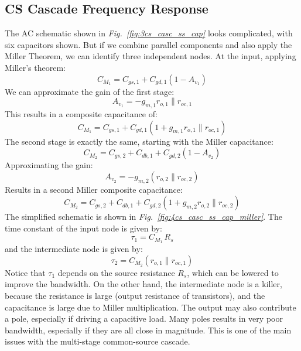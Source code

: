 \subsection{CS Cascade Frequency Response}
The AC schematic shown in \emph{Fig.~\ref{fig:3cs_casc_ss_cap}} looks complicated, with six capacitors shown.  But if we combine parallel components and also apply the Miller Theorem, we can identify three independent nodes.  At the input, applying Miller's theorem:
    \begin{equation} 
        C_{M_1} = C_{gs,1} + C_{gd,1} (1 - A_{v_1})
    \end{equation}
We can approximate the gain of the first stage:
    \begin{equation} 
        A_{v_1} = -g_{m,1} r_{o,1} \parallel r_{oc,1}
    \end{equation}
This results in a composite capacitance of:
    \begin{equation} 
        C_{M_1} = C_{gs,1} + C_{gd,1} (1 + g_{m,1} r_{o,1} \parallel r_{oc,1})
    \end{equation}
The second stage is exactly the same, starting with the Miller capacitance:
    \begin{equation} 
        C_{M_2} = C_{gs,2} + C_{db,1} + C_{gd,2} (1 - A_{v_2})
    \end{equation}
Approximating the gain:
    \begin{equation} 
        A_{v_2} = -g_{m,2} (r_{o,2} \parallel r_{oc,2})
    \end{equation}
Results in a second Miller composite capacitance:
    \begin{equation} 
        C_{M_2} = C_{gs,2} + C_{db,1} + C_{gd,2} (1 + g_{m,2} r_{o,2} \parallel r_{oc,2})
    \end{equation}
The simplified schematic is shown in \emph{Fig.~\ref{fig:4cs_casc_ss_cap_miller}}.  The time constant of the input node is given by:
    \begin{equation}
        \tau_1 = C_{M_1}\,R_s
    \end{equation}
and the intermediate node is given by:
    \begin{equation} 
        \tau_2 = C_{M_2}(r_{o,1} \parallel r_{oc,1})
    \end{equation}
Notice that $\tau_1$ depends on the source resistance $R_s$, which can be lowered to improve the bandwidth.  On the other hand,  the intermediate node is a killer, because the resistance is large (output resistance of transistors), and the capacitance is large due to Miller multiplication.  The output may also contribute a pole, especially if driving a capacitive load.  Many poles results in very poor bandwidth, especially if they are all close in magnitude.  This is one of the main issues with the multi-stage common-source cascade.
